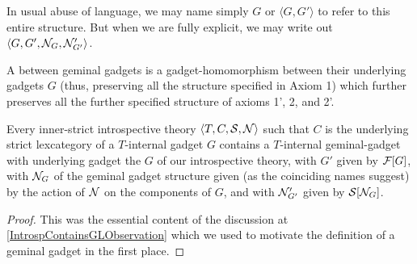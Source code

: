 \documentclass[./main.tex]{subfiles}
\begin{document}
\begin{definition}
In usual abuse of language, we may name simply $G$ or $\langle G, G' \rangle$ to refer to this entire structure. But when we are fully explicit, we may write out $\langle G, G', \mathcal{N}_{G}, \mathcal{N}'_{G'} \rangle$.


A  between geminal gadgets is a gadget-homomorphism between their underlying gadgets $G$ (thus, preserving all the structure specified in Axiom 1) which further preserves all the further specified structure of axioms 1', 2, and 2'.
\end{definition}

\begin{theorem}\label{IntrospContainsGL}
Every inner-strict introspective theory $\langle T, C, \mathcal{S}, \mathcal{N} \rangle$ such that $C$ is the underlying strict lexcategory of a $T$-internal gadget $G$ contains a $T$-internal geminal-gadget with underlying gadget the $G$ of our introspective theory, with $G'$ given by $\mathcal{F}[G]$, with $\mathcal{N}_{G}$ of the geminal gadget structure given (as the coinciding names suggest) by the action of $\mathcal{N}$ on the components of $G$, and with $\mathcal{N}'_{G'}$ given by $\mathcal{S}[\mathcal{N}_{G}]$.
\end{theorem}
\begin{proof}
This was the essential content of the discussion at \cref{IntrospContainsGLObservation} which we used to motivate the definition of a geminal gadget in the first place.
\end{proof}
\end{document}

